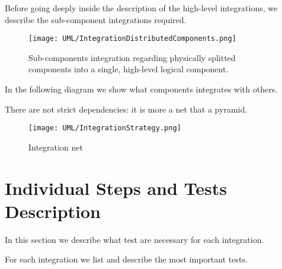 \documentclass[11pt]{article} %
\begin{document}
Before going deeply inside the description of the high-level integrations, we describe the sub-component integrations required.

\begin{figure}[H]
	\centering
	\texttt{[image: UML/IntegrationDistributedComponents.png]}
	\caption{Sub-components integration regarding physically splitted components into a single, high-level logical component.}
\end{figure}	

In the following diagram we show what components integrates with others.

There are not strict dependencies: it is more a net that a pyramid.

\begin{figure}[H]
	\centering
	\texttt{[image: UML/IntegrationStrategy.png]}
	\caption{Integration net}
\end{figure}	


\newpage
\section{Individual Steps and Tests Description}

In this section we describe what test are necessary for each integration.

For each integration we list and describe the most important tests.
\end{document}
